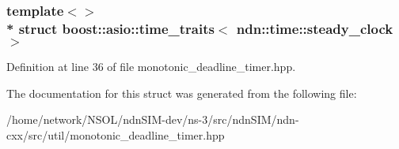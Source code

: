 \subsubsection*{template$<$$>$\\*
struct boost\+::asio\+::time\+\_\+traits$<$ ndn\+::time\+::steady\+\_\+clock $>$}



Definition at line 36 of file monotonic\+\_\+deadline\+\_\+timer.\+hpp.



The documentation for this struct was generated from the following file\+:\begin{DoxyCompactItemize}
\item 
/home/network/\+N\+S\+O\+L/ndn\+S\+I\+M-\/dev/ns-\/3/src/ndn\+S\+I\+M/ndn-\/cxx/src/util/monotonic\+\_\+deadline\+\_\+timer.\+hpp\end{DoxyCompactItemize}
